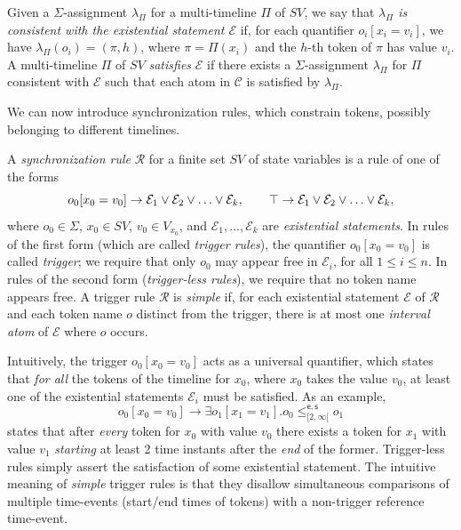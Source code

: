   Given a $\Sigma$-assignment $\lambda_\Pi$ for a multi-timeline $\Pi$ of $SV$,
  we say that \emph{$\lambda_\Pi$ is consistent with the existential statement $\mathcal{E}$} if, for each quantifier $o_i[x_i=v_i]$, we have
   $\lambda_\Pi(o_i)=(\pi,h)$, where $\pi=\Pi(x_i)$ and the $h$-th token of $\pi$ has value $v_i$. A multi-timeline $\Pi$ of $SV$ \emph{satisfies} $\mathcal{E}$
   if there exists a $\Sigma$-assignment $\lambda_\Pi$ for $\Pi$ consistent with $\mathcal{E}$ such that each atom in $\mathcal{C}$ is satisfied by
   $\lambda_\Pi$.

We can now introduce synchronization rules, which constrain tokens, possibly belonging to different timelines.
\begin{definition}
  A \emph{synchronization rule} $\mathcal{R}$ for a finite set $SV$ of state variables is a rule of one of the forms
  \[
  o_0[x_0=v_0] \to \mathcal{E}_1\lor \mathcal{E}_2\lor \ldots \lor \mathcal{E}_k, \qquad
          \operatorname{\top} \to \mathcal{E}_1\lor \mathcal{E}_2\lor \ldots \lor \mathcal{E}_k,
  \]
  where $o_0\in\Sigma$, $x_0\in SV$, $v_0\in V_{x_0}$, and $\mathcal{E}_1, \ldots, \mathcal{E}_k$
  are \emph{existential statements}. %
  In rules of the first
  form (which are called \emph{trigger rules}), the quantifier $o_0[x_0=v_0]$ is called \emph{trigger}; we require that only $o_0$ may appear free in $\mathcal{E}_i$, for all $1\leq i\leq n$. In rules of the second form (\emph{trigger-less rules}), we require
  that no token name appears free.
  \newline
  A trigger rule $\mathcal{R}$ is \emph{simple} if, for each existential statement $\mathcal{E}$ of $\mathcal{R}$ and each token name $o$ distinct from the trigger, there is at most one \emph{interval atom}
  of $\mathcal{E}$ where $o$ occurs.
\end{definition}

Intuitively, the  trigger $o_0[x_0=v_0]$ acts as a universal quantifier, which
states that \emph{for all} the tokens of the timeline for
$x_0$, where $x_0$ takes the
value $v_0$, at least one of the existential statements $\mathcal{E}_i$ must be satisfied. 
As an example, \[o_0[x_0=v_0]\to \exists o_1[x_1=v_1].o_0\leq^{\mathsf{e},\mathsf{s}}_{[2,\infty[} o_1\] states that after \emph{every} token for $x_0$ with value $v_0$ there exists a token for $x_1$ with value $v_1$ \emph{starting} at least 2 time instants after the \emph{end} of the former.
Trigger-less rules simply assert the
satisfaction of some existential statement. The intuitive meaning of \emph{simple} trigger rules is that they disallow simultaneous comparisons of multiple time-events
 (start/end times of tokens) with a non-trigger reference time-event. 
 
